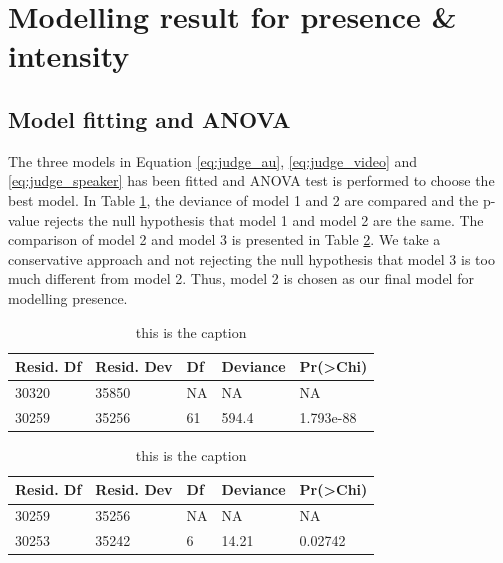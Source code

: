 \documentclass{monashthesis}
\begin{document}
\newpage

\hypertarget{modelling-result-for-presence-intensity}{%
\section{Modelling result for presence \& intensity}\label{modelling-result-for-presence-intensity}}

\hypertarget{model-fitting-and-anova}{%
\subsection{Model fitting and ANOVA}\label{model-fitting-and-anova}}

The three models in Equation \ref{eq:judge_au}, \ref{eq:judge_video} and \ref{eq:judge_speaker} has been fitted and ANOVA test is performed to choose the best model. In Table \ref{tab:anova-1}, the deviance of model 1 and 2 are compared and the p-value rejects the null hypothesis that model 1 and model 2 are the same. The comparison of model 2 and model 3 is presented in Table \ref{tab:anova-2}. We take a conservative approach and not rejecting the null hypothesis that model 3 is too much different from model 2. Thus, model 2 is chosen as our final model for modelling presence.

\begin{table}[ht]
\begin{center}
\caption{\label{tab:anova-1}this is the caption}
\begin{tabular}{lllll}
\toprule
Resid. Df & Resid. Dev & Df & Deviance & Pr(>Chi) \\
\midrule
30320 & 35850 & NA &    NA &        NA \\
30259 & 35256 & 61 & 594.4 & 1.793e-88 \\
\bottomrule
\end{tabular}
\end{center}
\end{table}

\begin{table}[ht]
\begin{center}
\caption{\label{tab:anova-2}this is the caption}
\begin{tabular}{lllll}
\toprule
Resid. Df & Resid. Dev & Df & Deviance & Pr(>Chi) \\
\midrule
30259 & 35256 & NA &    NA &      NA \\
30253 & 35242 &  6 & 14.21 & 0.02742 \\
\bottomrule
\end{tabular}
\end{center}
\end{table}
\end{document}
